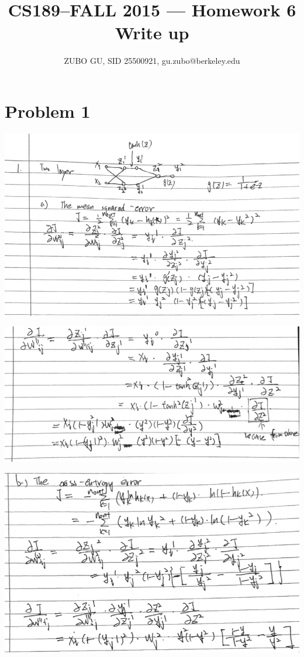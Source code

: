\documentclass[11pt]{article}
\title{CS189--FALL 2015 --- Homework 6 Write up}
\author{ZUBO GU, SID 25500921, gu.zubo@berkeley.edu}
\date{}
\begin{document}
\maketitle

\section*{Problem 1}
\includegraphics[scale = 0.5]{1.png}

\includegraphics[scale = 0.5]{2.png}

\includegraphics[scale = 0.5]{3.png}
\end{document}
